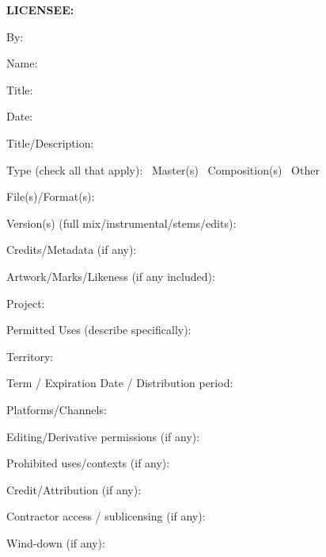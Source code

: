 \bigskip
\noindent\textbf{LICENSEE:}

\sigblock{\licenseeName}
\par\medskip\noindent By: \fillin[3in]\par
\par\smallskip\noindent Name: \licenseeSignName\par
\par\smallskip\noindent Title: \licenseeSignTitle\par
\par\smallskip\noindent Date: \fillin[3in]\par

\newpage
{}

\noindent Title/Description: \fillin[10cm]\par
\medskip
\noindent Type (check all that apply): \framebox[1.4ex]{\rule{0pt}{1.4ex}}~Master(s) \quad
\framebox[1.4ex]{\rule{0pt}{1.4ex}}~Composition(s) \quad
\framebox[1.4ex]{\rule{0pt}{1.4ex}}~Other \fillin[4cm]\par
\medskip
\noindent File(s)/Format(s): \fillin[10cm]\par
\medskip
\noindent Version(s) (full mix/instrumental/stems/edits): \fillin[7cm]\par
\medskip
\noindent Credits/Metadata (if any): \fillin[9cm]\par
\medskip
\noindent Artwork/Marks/Likeness (if any included): \fillin[7cm]\par

\newpage
{}

\noindent Project: \fillin[11cm]\par
\medskip
\noindent Permitted Uses (describe specifically): \fillin[7cm]\par
\medskip
\noindent Territory: \fillin[11cm]\par
\medskip
\noindent Term / Expiration Date / Distribution period: \fillin[6cm]\par
\medskip
\noindent Platforms/Channels: \fillin[10cm]\par
\medskip
\noindent Editing/Derivative permissions (if any): \fillin[7cm]\par
\medskip
\noindent Prohibited uses/contexts (if any): \fillin[8cm]\par
\medskip
\noindent Credit/Attribution (if any): \fillin[9cm]\par
\medskip
\noindent Contractor access / sublicensing (if any): \fillin[7cm]\par
\medskip
\noindent Wind-down (if any): \fillin[10cm]\par

